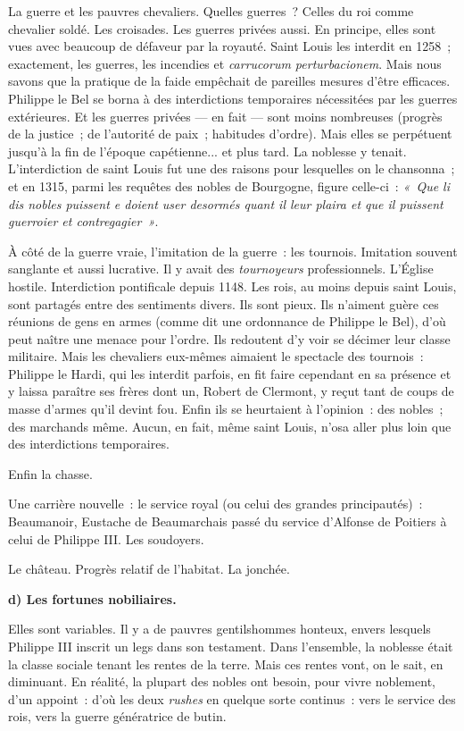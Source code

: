 \documentclass[french,twoside]{book} %
\newcommand{\labelchar}[1]{\textbf{\color{rubric} #1}}
\newcommand\chapterclose{} %
\begin{document}
\noindent La guerre et les pauvres chevaliers. Quelles guerres ? Celles du roi comme chevalier soldé. Les croisades. Les guerres privées aussi. En principe, elles sont vues avec beaucoup de défaveur par la royauté. Saint Louis les interdit en 1258 ; exactement, les guerres, les incendies et \emph{carrucorum perturbacionem}. Mais nous savons que la pratique de la faide empêchait de pareilles mesures d’être efficaces. Philippe le Bel se borna à des interdictions temporaires nécessitées par les guerres extérieures. Et les guerres privées — en fait — sont moins nombreuses (progrès de la justice ; de l’autorité de paix ; habitudes d’ordre). Mais elles se perpétuent jusqu’à la fin de l’époque capétienne... et plus tard. La noblesse y tenait. L’interdiction de saint Louis fut une des raisons pour lesquelles on le chansonna ; et en 1315, parmi les requêtes des nobles de Bourgogne, figure celle-ci : \emph{« Que li dis nobles puissent e doient user desormés quant il leur plaira et que il puissent guerroier et contregagier »}.\par
À côté de la guerre vraie, l’imitation de la guerre : les tournois. Imitation souvent sanglante et aussi lucrative. Il y avait des \emph{tournoyeurs} professionnels. L’Église hostile. Interdiction pontificale depuis 1148. Les rois, au moins depuis saint Louis, sont partagés entre des sentiments divers. Ils sont pieux. Ils n’aiment guère ces réunions de gens en armes (comme dit une ordonnance de Philippe le Bel), d’où peut naître une menace pour l’ordre. Ils redoutent d’y voir se décimer leur classe militaire. Mais les chevaliers eux-mêmes aimaient le spectacle des tournois : Philippe le Hardi, qui les interdit parfois, en fit faire cependant en sa présence et y laissa paraître ses frères dont un, Robert de Clermont, y reçut tant de coups de masse d’armes qu’il devint fou. Enfin ils se heurtaient à l’opinion : des nobles ; des marchands même. Aucun, en fait, même saint Louis, n’osa aller plus loin que des interdictions temporaires.\par
Enfin la chasse.\par
Une carrière nouvelle : le service royal (ou celui des grandes principautés) : Beaumanoir, Eustache de Beaumarchais passé du service d’Alfonse de Poitiers à celui de Philippe III. Les soudoyers.\par
Le château. Progrès relatif de l’habitat. La jonchée.\par
\bigbreak
\noindent \labelchar{d) Les fortunes nobiliaires.}\par
Elles sont variables. Il y a de pauvres gentilshommes honteux, envers lesquels Philippe III inscrit un legs dans son testament. Dans l’ensemble, la noblesse était la classe sociale tenant les rentes de la terre. Mais ces rentes vont, on le sait, en diminuant. En réalité, la plupart des nobles ont besoin, pour vivre noblement, d’un appoint : d’où les deux {\itshape rushes} en quelque sorte continus : vers le service des rois, vers la guerre génératrice de butin.
\chapterclose
\end{document}
